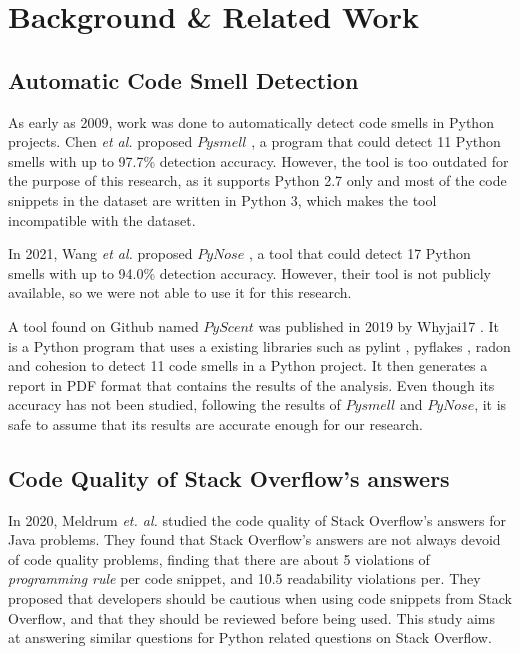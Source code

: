 
\section{Background \& Related Work}
\label{sec:related-work}
\subsection{Automatic Code Smell Detection}
\label{sec:related-work-automatic-code-smell-detection}
As early as 2009, work was done to automatically detect code smells in Python projects. Chen \textit{et al.} proposed $Pysmell$ \cite{pysmell}, a program that could detect 11 Python smells with up to 97.7\% detection accuracy. However, the tool is too outdated for the purpose of this research, as it supports Python 2.7 only and most of the code snippets in the dataset are written in Python 3, which makes the tool incompatible with the dataset.

In 2021, Wang \textit{et al.} proposed $PyNose$ \cite{pynose}, a tool that could detect 17 Python smells with up to 94.0\% detection accuracy. However, their tool is not publicly available, so we were not able to use it for this research.

A tool found on Github named $PyScent$ was published in 2019 by Whyjai17 \cite{pyscent}. It is a Python program that uses a existing libraries such as pylint \cite{pylint}, pyflakes \cite{pyflake}, radon \cite{radon} and cohesion \cite{cohesion} to detect 11 code smells in a Python project. It then generates a report in PDF format that contains the results of the analysis. Even though its accuracy has not been studied, following the results of $Pysmell$ and $PyNose$, it is safe to assume that its results are accurate enough for our research.

\subsection{Code Quality of Stack Overflow's answers}
\label{sec:related-work-code-quality-of-stack-overflow-answers}
In 2020, Meldrum \textit{et. al.} \cite{meldrum-2020} studied the code quality of Stack Overflow's answers for Java problems. They found that Stack Overflow's answers are not always devoid of code quality problems, finding that there are about 5 violations of \textit{programming rule} per code snippet, and 10.5 readability violations per. They proposed that developers should be cautious when using code snippets from Stack Overflow, and that they should be reviewed before being used. This study aims at answering similar questions for Python related questions on Stack Overflow.

